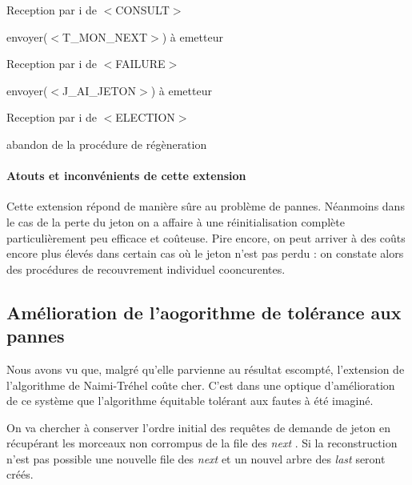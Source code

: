 \documentclass[a4paper,12pt]{article}
\newcommand{\nt}{Naimi-Tréhel }
\newcommand{\last}{\textit{last} }
\newcommand{\next}{\textit{next} }
\begin{document}
\begin{algorithm}[t]
\caption{Reception par i de $<$CONSULT$>$}
\label{algo_naimi_trehel_ext_Consult}
\begin{algorithmic}[1]
\IF{\next$_{i}$ $=$ i}
\STATE envoyer($<$T\_MON\_NEXT$>$) à emetteur 
\ENDIF
\end{algorithmic}
\end{algorithm}

\begin{algorithm}[t]
\caption{Reception par i de $<$FAILURE$>$}
\label{algo_naimi_trehel_ext_Failure}
\begin{algorithmic}[1]
\STATE envoyer($<$J\_AI\_JETON$>$) à emetteur
\ENDIF
\end{algorithmic}
\end{algorithm}

\begin{algorithm}[t]
\caption{Reception par i de $<$ELECTION$>$}
\label{algo_naimi_trehel_ext_Election}
\begin{algorithmic}[1]
  \STATE abandon de la procédure de régèneration
  \ENDIF
\ENDIF
\end{algorithmic}
\end{algorithm}

\paragraph{Atouts et inconvénients de cette extension}
Cette extension répond de manière sûre au problème de pannes. Néanmoins dans le cas de la perte du jeton on a affaire à une réinitialisation complète particulièrement peu efficace et coûteuse. Pire encore, on peut arriver à des coûts encore plus élevés dans certain cas où le jeton n'est pas perdu : on constate alors des procédures de recouvrement individuel cooncurentes.



\subsection{Amélioration de l'aogorithme de tolérance aux pannes}
Nous avons vu que, malgré qu'elle parvienne au résultat escompté, l'extension de l'algorithme de \nt coûte cher. C'est dans une optique d'amélioration de ce système que l'algorithme équitable tolérant aux fautes à été imaginé.

On va chercher à conserver l'ordre initial des requêtes de demande de jeton en récupérant les morceaux non corrompus de la file des \next. Si la reconstruction n'est pas possible une nouvelle file des \next et un nouvel arbre des \last seront créés.
\end{document}
